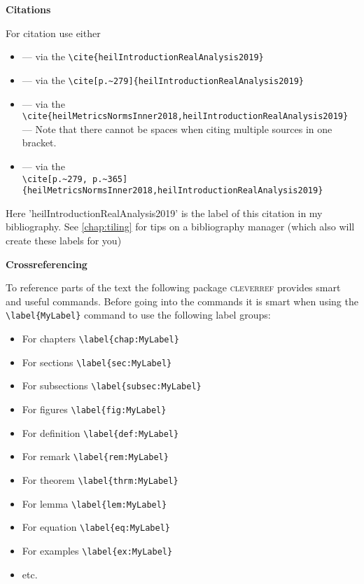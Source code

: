 \documentclass[../thesis.tex]{subfiles}
\begin{document}
\textbf{Citations}

For citation use either 
\begin{itemize}
    \item {\cite{heilIntroductionRealAnalysis2019}} — via the \verb|\cite{heilIntroductionRealAnalysis2019}|
    \item {\cite[p.~279]{heilIntroductionRealAnalysis2019}} — via the \verb|\cite[p.~279]{heilIntroductionRealAnalysis2019}|
    \item {\cite{heilMetricsNormsInner2018,heilIntroductionRealAnalysis2019}} — via the\\ \verb|\cite{heilMetricsNormsInner2018,heilIntroductionRealAnalysis2019}| — Note that there cannot be spaces when citing multiple sources in one bracket. 
    \item {\cite[p.~279, p.~365]{heilMetricsNormsInner2018,heilIntroductionRealAnalysis2019}} — via the\\ \verb|\cite[p.~279, p.~365]{heilMetricsNormsInner2018,heilIntroductionRealAnalysis2019}|
\end{itemize}
Here 'heilIntroductionRealAnalysis2019' is the label of this citation in my bibliography. See \cref{chap:tiling} for tips on a bibliography manager (which also will create these labels for you)


\textbf{Crossreferencing}

To reference parts of the text the following package \textsc{cleverref} provides smart and useful commands. Before going into the commands it is smart when using the \verb|\label{MyLabel}| command to use the following label groups:
\begin{itemize}
    \item For chapters \verb|\label{chap:MyLabel}|
    \item For sections \verb|\label{sec:MyLabel}|
    \item For subsections \verb|\label{subsec:MyLabel}|
    \item For figures \verb|\label{fig:MyLabel}|
    \item For definition \verb|\label{def:MyLabel}|
    \item For remark \verb|\label{rem:MyLabel}|
    \item For theorem \verb|\label{thrm:MyLabel}|
    \item For lemma \verb|\label{lem:MyLabel}|
    \item For equation \verb|\label{eq:MyLabel}|
    \item For examples \verb|\label{ex:MyLabel}|
    \item etc.
\end{itemize}
\end{document}
